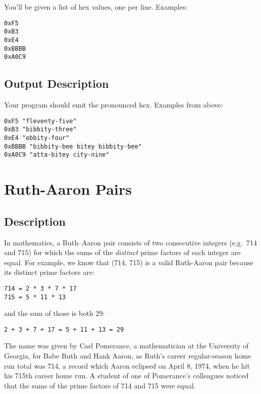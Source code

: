 You'll be given a list of hex values, one per line. Examples:

\begin{lstlisting}
0xF5
0xB3
0xE4
0xBBBB
0xA0C9 
\end{lstlisting}

\subsection*{Output Description}\label{output-description-5}

Your program should emit the pronounced hex. Examples from above:

\begin{lstlisting}
0xF5 "fleventy-five"
0xB3 "bibbity-three"
0xE4 "ebbity-four"
0xBBBB "bibbity-bee bitey bibbity-bee"
0xA0C9 "atta-bitey city-nine"
\end{lstlisting}


\section{Ruth-Aaron Pairs}

\subsection*{Description}\label{description-7}

In mathematics, a Ruth--Aaron pair consists of two consecutive integers
(e.g.~714 and 715) for which the sums of the \emph{distinct} prime
factors of each integer are equal. For example, we know that (714, 715)
is a valid Ruth-Aaron pair because its distinct prime factors are:

\begin{lstlisting}
714 = 2 * 3 * 7 * 17
715 = 5 * 11 * 13
\end{lstlisting}

and the sum of those is both 29:

\begin{lstlisting}
2 + 3 + 7 + 17 = 5 + 11 + 13 = 29
\end{lstlisting}

The name was given by Carl Pomerance, a mathematician at the University
of Georgia, for Babe Ruth and Hank Aaron, as Ruth's career
regular-season home run total was 714, a record which Aaron eclipsed on
April 8, 1974, when he hit his 715th career home run. A student of one
of Pomerance's colleagues noticed that the sums of the prime factors of
714 and 715 were equal.

